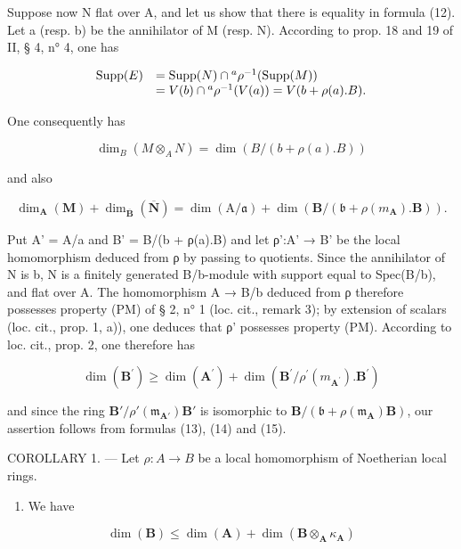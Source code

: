 Suppose now N flat over A, and let us show that there is equality in formula (12). Let a (resp. b) be the annihilator of M (resp. N). According to prop. 18 and 19 of II, § 4, n° 4, one has

\[
\begin{array}{r l} \operatorname{Supp} (E) & = \operatorname{Supp} (N) \cap {} ^ {a} \rho^ {- 1} (\operatorname{Supp} (M)) \\ & = V (b) \cap {} ^ {a} \rho^ {- 1} (V (a)) = V (b + \rho (a). B). \end{array}
\]

One consequently has

\[
\dim_ {B} (M \otimes_ {A} N) = \dim (B / (b + \rho (a). B))\tag{13}
\]

and also

\[
\dim_ {\mathbf {A}} (\mathbf {M}) + \dim_ {\overline {{\mathbf {B}}}} (\overline {{\mathbf {N}}}) = \dim (\mathrm{A} / \mathfrak {a}) + \dim (\mathbf {B} / (\mathfrak {b} + \rho (m _ {\mathbf {A}}). \mathbf {B}))  .\tag{14}
\]

Put A' = A/a and B' = B/(b + ρ(a).B) and let ρ':A' → B' be the local homomorphism deduced from ρ by passing to quotients. Since the annihilator of N is b, N is a finitely generated B/b-module with support equal to Spec(B/b), and flat over A. The homomorphism A → B/b deduced from ρ therefore possesses property (PM) of § 2, n° 1 (loc. cit., remark 3); by extension of scalars (loc. cit., prop. 1, a)), one deduces that ρ' possesses property (PM). According to loc. cit., prop. 2, one therefore has

\[
\dim (\mathbf {B} ^ {\prime}) \geqslant \dim (\mathbf {A} ^ {\prime}) + \dim (\mathbf {B} ^ {\prime} / \rho^ {\prime} (m _ {\mathbf {A} ^ {\prime}}). \mathbf {B} ^ {\prime})\tag{15}
\]

and since the ring \(\mathbf{B}'/\rho'(\mathfrak{m}_{\mathbf{A}'})\mathbf{B}'\) is isomorphic to \(\mathbf{B}/(\mathfrak{b} + \rho(\mathfrak{m}_{\mathbf{A}})\mathbf{B})\), our assertion follows from formulas (13), (14) and (15).

COROLLARY 1. --- Let \(\rho: A \to B\) be a local homomorphism of Noetherian local rings.

\begin{enumerate}
\def\labelenumi{\alph{enumi})}
\tightlist
\item
  We have
\end{enumerate}

\[
\dim (\mathbf {B}) \leqslant \dim (\mathbf {A}) + \dim (\mathbf {B} \otimes_ {\mathbf {A}} \kappa_ {\mathbf {A}})\tag{16}
\]

